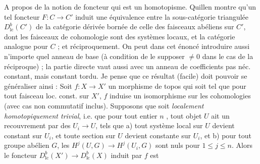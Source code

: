 \documentclass[11pt,a4paper]{article}
\begin{document}
A propos de la notion de foncteur qui est un homotopisme. Quillen montre
qu'un tel foncteur $F : C \to C'$ induit une équivalence entre la
sous-catégorie triangulée $D^b_{\mathrm{lc}}(C')$ de la catégorie
dérivée bornée de celle des faisceaux abéliens sur $C'$, dont
les faisceaux de cohomologie sont des systèmes locaux, et la catégorie
analogue pour $C$ ; et réciproquement. On peut dans cet énoncé introduire
aussi n'importe quel anneau de base (à condition de le supposer $\neq 0$
dans le cas de la réciproque) ; la partie directe vaut aussi avec un
anneau de coefficients pas néc. constant, mais constant tordu. Je pense que
ce résultat (facile) doit pouvoir se généraliser ainsi : Soit
$f : X \to X'$ un morphisme de topos qui soit tel que pour tout faisceau
loc. const. sur $X'$, $f$ induise un isomorphisme sur les cohomologies
(avec cas non commutatif inclus). Supposons que \struck{\ill{}}
 soit \emph{localement homotopiquement trivial}, i.e. que
pour tout entier $n$ , tout objet $U$  ait un
recouvrement par des $U_i \to U$, tels que a) tout système local sur $U$
devient constant sur $U_i$, et toute section sur $U$ devient constante sur
$U_i$, et b) pour tout groupe abélien $G$, les
$H^j(U,G) \to H^j(U_i,G)$ sont nuls pour $1 \leq j \leq n$. Alors le
foncteur $D^b_{\mathrm{lc}}(X') \to D^b_{\mathrm{lc}}(X)$ induit par $f$
est
\end{document}
